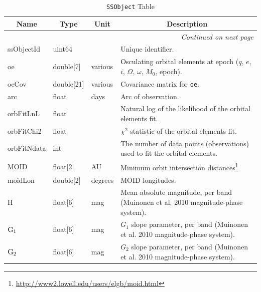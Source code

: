 \documentclass[12pt]{article}
\newcommand{\code}[1]{\texttt{#1}}
\newcommand{\SSObject}{\code{SSObject}\xspace}
\begin{document}
\begin{center}
\begin{longtable}{p{3cm}p{2cm}p{2cm}p{5cm}}
\caption[\SSObject Table]{\SSObject Table} \\

\hline \multicolumn{1}{c}{\bf Name} & \multicolumn{1}{c}{\bf Type} & \multicolumn{1}{c}{\bf Unit} & \multicolumn{1}{c}{\bf Description} \\ \hline
\endhead

\hline \multicolumn{4}{r}{{\em Continued on next page}} \\
\endfoot

\hline\hline
\endlastfoot

ssObjectId & uint64 & ~ & Unique identifier. \\

oe & double[7] & various & Osculating orbital elements at epoch ($q$, $e$, $i$, $\Omega$, $\omega$, $M_0$, epoch). \\

oeCov & double[21] & various & Covariance matrix for \texttt{oe}. \\

arc & float & days & Arc of observation. \\

orbFitLnL & float & ~ & Natural log of the likelihood of the orbital elements fit. \\

orbFitChi2 & float & ~ & $\chi^2$ statistic of the orbital elements fit. \\

orbFitNdata & int & ~ & The number of data points (observations) used to fit the orbital elements. \\

MOID & float[2] & AU & Minimum orbit intersection distances\footnote{\url{http://www2.lowell.edu/users/elgb/moid.html}} \\

moidLon & double[2] & degrees & MOID longitudes. \\

H & float[6] & mag & Mean absolute magnitude, per band (Muinonen et al. 2010 magnitude-phase system). \\

${\rm G_1}$ & float[6] & mag & $G_1$ slope parameter, per band (Muinonen et al. 2010 magnitude-phase system). \\

${\rm G_2}$ & float[6] & mag & $G_2$ slope parameter, per band (Muinonen et al. 2010 magnitude-phase system). \\


\end{longtable}
\end{center}
\end{document}

